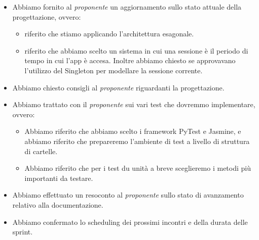\begin{itemize}
    \item Abbiamo fornito al \emph{proponente} un aggiornamento sullo stato attuale della progettazione, ovvero: 
        \begin{itemize}
            \item riferito che stiamo applicando l'architettura esagonale.
            \item riferito che abbiamo scelto un sistema in cui una sessione è il periodo di tempo in cui l'app è accesa. Inoltre abbiamo chiesto se approvavano l'utilizzo del Singleton per modellare la sessione corrente.
        \end{itemize}
    \item Abbiamo chiesto consigli al \emph{proponente} riguardanti la progettazione.
    \item Abbiamo trattato con il \emph{proponente} sui vari test che dovremmo implementare, ovvero:
        \begin{itemize}
            \item Abbiamo riferito che abbiamo scelto i framework PyTest e Jasmine, e abbiamo riferito che prepareremo l'ambiente di test a livello di struttura di cartelle. 
            \item Abbiamo riferito che per i test du unità a breve sceglieremo i metodi più importanti da testare.
        \end{itemize}
    \item Abbiamo effettuato un resoconto al \emph{proponente} sullo stato di avanzamento relativo alla documentazione.
    \item Abbiamo confermato lo scheduling dei prossimi incontri e della durata delle sprint.


\end{itemize}
